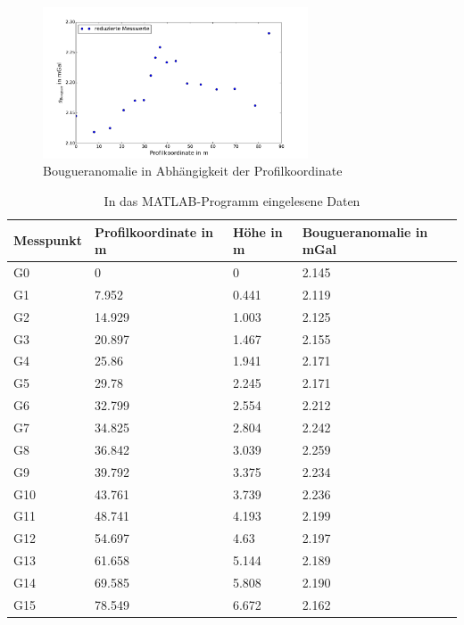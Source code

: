 \begin{figure}[!ht]
 \centering
 \includegraphics[width=0.7\textwidth]{fig/Plot_Bouguer_mit_letztem_Punkt}
 \caption{Bougueranomalie in Abhängigkeit der Profilkoordinate}
 \label{fig:Bougueranomalie}
\end{figure}

\begin{table}[!ht]
\centering
\caption{In das MATLAB-Programm eingelesene Daten}
\label{tab:Input}
\begin{tabular}{llll}
\toprule
Messpunkt & Profilkoordinate in m & Höhe in m & Bougueranomalie in mGal \\
\midrule
G0        & 0                     & 0         & 2.145                   \\
G1        & 7.952                 & 0.441     & 2.119                   \\
G2        & 14.929                & 1.003     & 2.125                   \\
G3        & 20.897                & 1.467     & 2.155                   \\
G4        & 25.86                 & 1.941     & 2.171                   \\
G5        & 29.78                 & 2.245     & 2.171                   \\
G6        & 32.799                & 2.554     & 2.212                   \\
G7        & 34.825                & 2.804     & 2.242                   \\
G8        & 36.842                & 3.039     & 2.259                   \\
G9        & 39.792                & 3.375     & 2.234                   \\
G10       & 43.761                & 3.739     & 2.236                   \\
G11       & 48.741                & 4.193     & 2.199                   \\
G12       & 54.697                & 4.63      & 2.197                   \\
G13       & 61.658                & 5.144     & 2.189                   \\
G14       & 69.585                & 5.808     & 2.190                   \\
G15       & 78.549                & 6.672     & 2.162                  \\
\bottomrule
\end{tabular}
\end{table}

